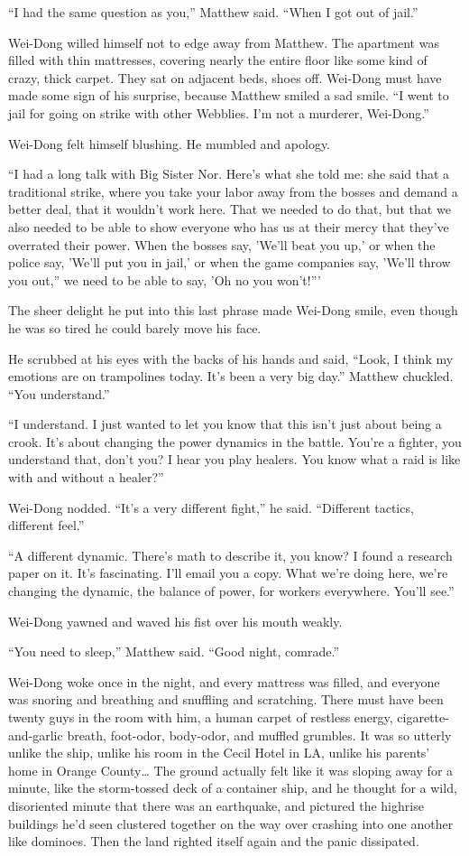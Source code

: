 ``I had the same question as you,'' Matthew said. ``When I got out of
jail.''

Wei-Dong willed himself not to edge away from Matthew. The
apartment was filled with thin mattresses, covering nearly the
entire floor like some kind of crazy, thick carpet. They sat on
adjacent beds, shoes off. Wei-Dong must have made some sign of his
surprise, because Matthew smiled a sad smile. ``I went to jail for
going on strike with other Webblies. I'm not a murderer,
Wei-Dong.''

Wei-Dong felt himself blushing. He mumbled and apology.

``I had a long talk with Big Sister Nor. Here's what she told me:
she said that a traditional strike, where you take your labor away
from the bosses and demand a better deal, that it wouldn't work
here. That we needed to do that, but that we also needed to be able
to show everyone who has us at their mercy that they've overrated
their power. When the bosses say, 'We'll beat you up,' or when the
police say, 'We'll put you in jail,' or when the game companies
say, 'We'll throw you out,'' we need to be able to say, 'Oh no you
won't!'''

The sheer delight he put into this last phrase made Wei-Dong smile,
even though he was so tired he could barely move his face.

He scrubbed at his eyes with the backs of his hands and said,
``Look, I think my emotions are on trampolines today. It's been a
very big day.'' Matthew chuckled. ``You understand.''

``I understand. I just wanted to let you know that this isn't just
about being a crook. It's about changing the power dynamics in the
battle. You're a fighter, you understand that, don't you? I hear
you play healers. You know what a raid is like with and without a
healer?''

Wei-Dong nodded. ``It's a very different fight,'' he said. ``Different
tactics, different feel.''

``A different dynamic. There's math to describe it, you know? I
found a research paper on it. It's fascinating. I'll email you a
copy. What we're doing here, we're changing the dynamic, the
balance of power, for workers everywhere. You'll see.''

Wei-Dong yawned and waved his fist over his mouth weakly.

``You need to sleep,'' Matthew said. ``Good night, comrade.''

Wei-Dong woke once in the night, and every mattress was filled, and
everyone was snoring and breathing and snuffling and scratching.
There must have been twenty guys in the room with him, a human
carpet of restless energy, cigarette-and-garlic breath, foot-odor,
body-odor, and muffled grumbles. It was so utterly unlike the ship,
unlike his room in the Cecil Hotel in LA, unlike his parents' home
in Orange County\ldots{} The ground actually felt like it was sloping
away for a minute, like the storm-tossed deck of a container ship,
and he thought for a wild, disoriented minute that there was an
earthquake, and pictured the highrise buildings he'd seen clustered
together on the way over crashing into one another like dominoes.
Then the land righted itself again and the panic dissipated.

